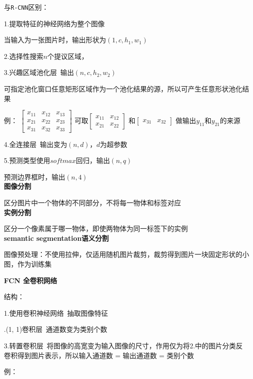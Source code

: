 \documentclass[UTF8]{ctexart}
\begin{document}
  与\texttt{R-CNN}区别：

  \quad 1.提取特征的神经网络为整个图像

  \quad \quad 当输入为一张图片时，输出形状为$(1, c, h_1, w_1)$

  \quad 2.选择性搜索$n$个提议区域，

  \quad 3.兴趣区域池化层\ 输出$(n, c, h_2, w_2)$

  \quad \quad 可指定池化窗口任意矩形区域作为一个池化结果的源，所以可产生任意形状池化结果

  \quad \quad 例：
    $\begin{bmatrix}
      x_{11} & x_{12} & x_{13} \\
      x_{21} & x_{22} & x_{23} \\
      x_{31} & x_{32} & x_{33}
      \end{bmatrix}$
    可取$\begin{bmatrix}
      x_{11} & x_{12} \\
      x_{21} & x_{22} 
      \end{bmatrix}$
    和$\begin{bmatrix}
      x_{31} & x_{32}
      \end{bmatrix}$
    做输出$y_{11}$和$y_{21}$的来源

  \quad 4.全连接层\ 输出变为$(n, d)$，$d$为超参数

  \quad 5.预测类型使用$softmax回归$，输出$(n, q)$

  \quad \quad 预测边界框时，输出$(n, 4)$\\
\textbf{图像分割}

  区分图片中一个物体的不同部分，不将每一物体和标签对应\\
\textbf{实例分割}

  区分一个像素属于哪一物体，即使两物体为同一标签下的实例\\
\textbf{semantic segmentation语义分割}

  图像预处理：不使用拉伸，仅适用随机图片裁剪，裁剪得到图片一块固定形状的小图，作为训练集

  \textbf{FCN 全卷积网络}

  \quad 结构：
  
  \quad \quad 1.使用卷积神经网络\ 抽取图像特征

  \quad {}.(1, 1)卷积层\ 通道数变为类别个数

  \quad \quad 3.转置卷积层\ 将图像的高宽变为输入图像的尺寸，作用仅为将2.中的图片分类反卷积得到图片表示，所以输入通道数 = 输出通道数 = 类别个数

  \quad 例：
\end{document}
